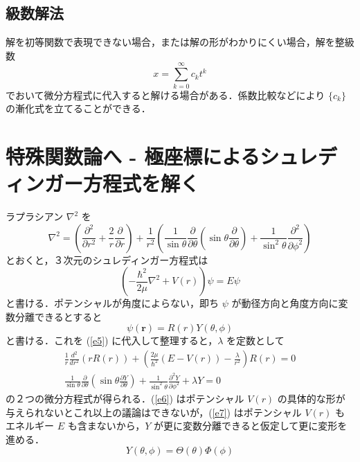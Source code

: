 \documentclass[dvipdfmx, a4paper]{jsarticle}
\begin{document}
\subsection{級数解法}

解を初等関数で表現できない場合，または解の形がわかりにくい場合，解を整級数
\begin{equation}
    x=\sum_{k=0}^\infty c_kt^k
\end{equation}
でおいて微分方程式に代入すると解ける場合がある．係数比較などにより $\{c_k\}$ の漸化式を立てることができる．

\section{特殊関数論へ - 極座標によるシュレディンガー方程式を解く}

ラプラシアン $\nabla^2$ を
\begin{equation}
    \nabla^2=\left(\frac{\partial^2}{\partial r^2}+\frac{2}{r}\frac{\partial}{\partial r}\right)+\frac{1}{r^2}\left(\frac{1}{\sin\theta}\frac{\partial}{\partial\theta}\left(\sin\theta\frac{\partial}{\partial\theta}\right)+\frac{1}{\sin^2\theta}\frac{\partial^2}{\partial\phi^2}\right)
\end{equation}
とおくと，３次元のシュレディンガー方程式は
\begin{equation}
    \label{e5}
    \left(-\frac{\hbar^2}{2\mu}\nabla^2+V(r)\right)\psi=E\psi
\end{equation}
と書ける．ポテンシャルが角度によらない，即ち $\psi$ が動径方向と角度方向に変数分離できるとすると
\begin{equation}
    \psi(\bm r)=R(r)Y(\theta, \phi)
\end{equation}
と書ける．これを (\ref{e5}) に代入して整理すると，$\lambda$ を定数として
\begin{eqnarray}
    \label{e6}
    \frac{1}{r}\frac{d^2}{dr^2}(rR(r))+\left(\frac{2\mu}{\hbar^2}(E-V(r))-\frac{\lambda}{r^2}\right)R(r)=0\\
    \label{e7}
    \frac{1}{\sin\theta}\frac{\partial}{\partial\theta}\left(\sin\theta\frac{\partial Y}{\partial\theta}\right)+\frac{1}{\sin^2\theta}\frac{\partial^2Y}{\partial\phi^2}+\lambda Y=0
\end{eqnarray}
の２つの微分方程式が得られる．(\ref{e6}) はポテンシャル $V(r)$ の具体的な形が与えられないとこれ以上の議論はできないが，(\ref{e7}) はポテンシャル $V(r)$ もエネルギー $E$ も含まないから，$Y$ が更に変数分離できると仮定して更に変形を進める．
\begin{equation}
    Y(\theta, \phi)=\Theta(\theta)\Phi(\phi)
\end{equation}
\end{document}
